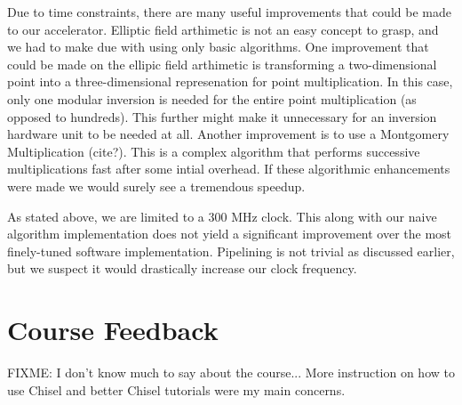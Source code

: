 \documentclass[twocolumn]{article}
\begin{document}
Due to time constraints, there are many useful improvements that could be made
to our accelerator. Elliptic field arthimetic is not an easy concept to grasp, and
we had to make due with using only basic algorithms. One improvement that could be made
on the ellipic field arthimetic is transforming a two-dimensional point into a three-dimensional
represenation for point multiplication. In this case, only one modular inversion is needed
for the entire point multiplication (as opposed to hundreds). This further might make it 
unnecessary for an inversion hardware unit to be needed at all. Another improvement is to use
a Montgomery Multiplication (cite?). This is a complex algorithm that performs successive 
multiplications fast after some intial overhead. If these algorithmic enhancements were made we
would surely see a tremendous speedup.

As stated above, we are limited to a 300 MHz clock. This along with our naive algorithm implementation 
does not yield a significant improvement over the most finely-tuned software implementation. Pipelining 
is not trivial as discussed earlier, but we suspect it would drastically increase our clock frequency. 




\section{Course Feedback}

FIXME: I don't know much to say about the course... More instruction on how to use Chisel
and better Chisel tutorials were my main concerns.



\end{document}
